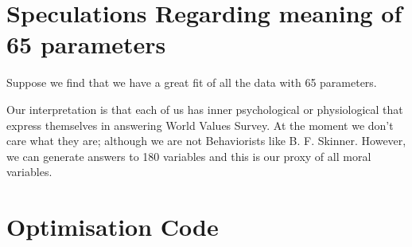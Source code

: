 \documentclass{amsart}
\begin{document}
\section{Speculations Regarding meaning of 65 parameters}

Suppose we find that we have a great fit of all the data with 65 parameters.

Our interpretation is that each of us has inner psychological or physiological that express themselves in answering World Values Survey.  At the moment we don't care what they are; although we are not Behaviorists like B. F. Skinner.  However, we can generate answers to 180 variables and this is our proxy of all moral variables.

\section{Optimisation Code}
\end{document}
